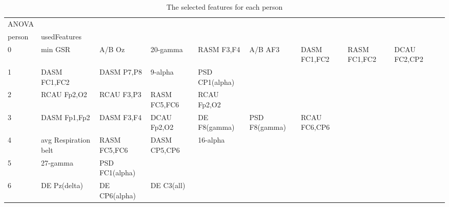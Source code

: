 \begin{landscape}
\begin{table}[]
\centering
\caption{The selected features for each person}
\begin{tabular}{l|llllllll}
ANOVA    &                       &                       &                      &                         &                         &                      &                      &                       &                       &                    \\
person   & usedFeatures          &                       &                      &                         &                         &                      &                      &                       &                       &                    \\
0        & min GSR               & A/B Oz                & 20-gamma             & RASM F3,F4              & A/B AF3                 & DASM FC1,FC2         & RASM FC1,FC2         & DCAU FC2,CP2          &                       &                    \\
1        & DASM FC1,FC2          & DASM P7,P8            & 9-alpha              & PSD CP1(alpha)          &                         &                      &                      &                       &                       &                    \\
2        & RCAU Fp2,O2           & RCAU F3,P3            & RASM FC5,FC6         & RCAU Fp2,O2             &                         &                      &                      &                       &                       &                    \\
3        & DASM Fp1,Fp2          & DASM F3,F4            & DCAU Fp2,O2          & DE F8(gamma)            & PSD F8(gamma)           & RCAU FC6,CP6         &                      &                       &                       &                    \\
4        & avg Respiration belt  & RASM FC5,FC6          & DASM CP5,CP6         & 16-alpha                &                         &                      &                      &                       &                       &                    \\
5        & 27-gamma              & PSD FC1(alpha)        &                      &                         &                         &                      &                      &                       &                       &                    \\
6        & DE Pz(delta)          & DE CP6(alpha)         & DE C3(all)           &                         &                         &                      &                      &                       &                       &                    \\

\end{tabular}
\end{table}
\end{landscape}
